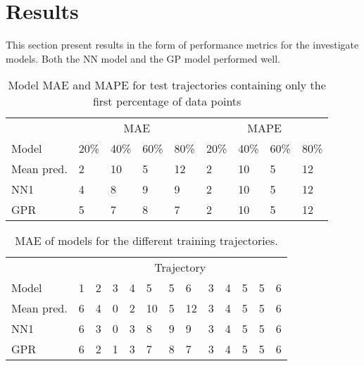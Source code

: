 
\captionsetup{width=.75\textwidth}


\chapter{Results}
\label{cha:results}
This section present results in the form of performance metrics for the investigate models. Both the NN model and the GP model performed well.
\begin{table}[H]
  \centering
  \caption{Model MAE and MAPE for test trajectories containing only the first percentage of data points}
  \label{tbl:models-mae-and-mape}
  \begin{tabular}{l | l | l | l | l || l | l | l | l }
    & \multicolumn{4}{c}{MAE} & \multicolumn{4}{c}{MAPE} \\
    Model      & 20\% & 40\% & 60\% & 80\% & 20\% & 40\% & 60\% & 80\% \\
    \hline
    Mean pred. & 2 & 10 & 5 & 12  & 2 & 10 & 5 & 12 \\
    NN1        & 4 &  8 & 9 &  9  & 2 & 10 & 5 & 12 \\
    GPR        & 5 &  7 & 8 &  7  & 2 & 10 & 5 & 12 \\
  \end{tabular}
\end{table}

\begin{table}[H]
  \centering
  \caption{MAE of models for the different training trajectories.}
  \label{tbl:model-mae-of-trajs}
  \begin{tabular}{ l | l | l | l | l | l | l | l | l | l | l | l | l }
    & \multicolumn{12}{c}{Trajectory} \\
    Model       & 1 & 2 & 3 & 4 & 5  & 5 & 6 & 3 & 4 & 5  & 5 & 6 \\
    \hline
    Mean pred.  & 6 & 4 & 0 & 2 & 10 & 5 & 12 & 3 & 4 & 5  & 5 & 6 \\
    NN1         & 6 & 3 & 0 & 3 &  8 & 9 &  9 & 3 & 4 & 5  & 5 & 6 \\
    GPR         & 6 & 2 & 1 & 3 &  7 & 8 &  7 & 3 & 4 & 5  & 5 & 6 \\
  \end{tabular}
\end{table}

